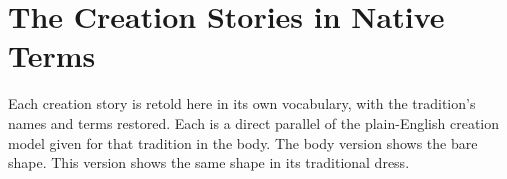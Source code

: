 \section{The Creation Stories in Native Terms}

Each creation story is retold here in its own vocabulary, with the tradition's names and terms restored. Each
is a direct parallel of the plain-English creation model given for that tradition in the body. The body
version shows the bare shape. This version shows the same shape in its traditional dress.







